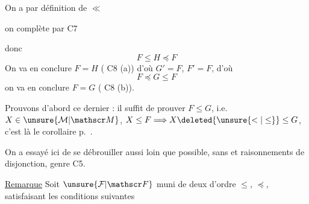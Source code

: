 
On a par définition de $\ll$

on complète par C7

 donc
\begingroup
\makeatletter
\tagsleft@true
\let\veqno\@@leqno
\makeatother
\[
F\leq H\preceq F \tag*{$(*)$}
\]
On va en conclure $F=H$ ( C8 (a)) d'où $G'=F$, $F'=F$, d'où
\[
F\preceq G\leq F \tag*{$(**)$}
\]
\endgroup
on va en conclure $F=G$ ( C8 (b)).

Prouvons d'abord ce dernier  : il  suffit de prouver $F\leq G$, i.e.  $X\in\unsure{\mathcal M|\mathscr M}$, $X\leq F\Longrightarrow X\deleted{\unsure{<|\leq}}\leq G$, c'est là  le corollaire p.~.


On a essayé ici de se débrouiller aussi loin que possible, sans  et raisonnements de disjonction, genre C5.


\uline{Remarque} Soit $\unsure{\mathcal F|\mathscr F}$  muni de deux  d'ordre $\leq$, $\preceq$, satisfaisant les conditions suivantes

